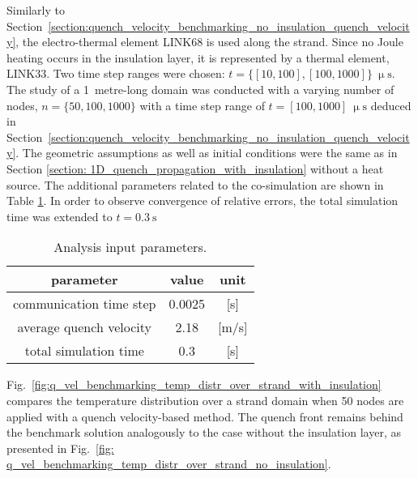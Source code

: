 
Similarly to Section~\ref{section:quench_velocity_benchmarking_no_insulation_quench_velocity}, the electro-thermal element LINK68 is used along the strand. Since no Joule heating occurs in the insulation layer, it is represented by a thermal element, LINK33. Two time step ranges were chosen: $t=\{[10, 100], [100, 1000]\}~\upmu \text{s}$. The study of a 1~metre-long domain was conducted with a varying number of nodes, $n=\{50, 100, 1000\}$ with a time step range of $t=[100, 1000]~\upmu \text{s}$ deduced in Section~\ref{section:quench_velocity_benchmarking_no_insulation_quench_velocity}. The geometric assumptions as well as initial conditions were the same as in Section \ref{section: 1D_quench_propagation_with_insulation} without a heat source. The additional parameters related to the co-simulation are shown in Table \ref{table:1d_qv_benchmarking_geometry__with_insulation_parameters_quench_velocity}. In order to observe convergence of relative errors, the total simulation time was extended to $t=0.3~\text{s}$

\begin{table}[H]
    \caption{Analysis input parameters.} 
    \vspace{-1.em} 
    \fontsize{10}{10}
    \selectfont 
    \renewcommand{\arraystretch}{1.5}
    \begin{center}
        \begin{tabular}{ ccc }  
        \hline
        parameter & value & unit \\
        \hline
        communication time step & 0.0025 & [s] \\
        average quench velocity & 2.18 & [m/s] \\
        total simulation time & 0.3 & [s] \\
        \hline 
        \end{tabular}
    \end{center}  
    \label{table:1d_qv_benchmarking_geometry__with_insulation_parameters_quench_velocity} 
\end{table}

Fig.~\ref{fig:q_vel_benchmarking_temp_distr_over_strand_with_insulation} compares the temperature distribution over a strand domain when 50 nodes are applied with a quench velocity-based method. The quench front remains behind the benchmark solution analogously to the case without the insulation layer, as presented in Fig.~\ref{fig: q_vel_benchmarking_temp_distr_over_strand_no_insulation}.


